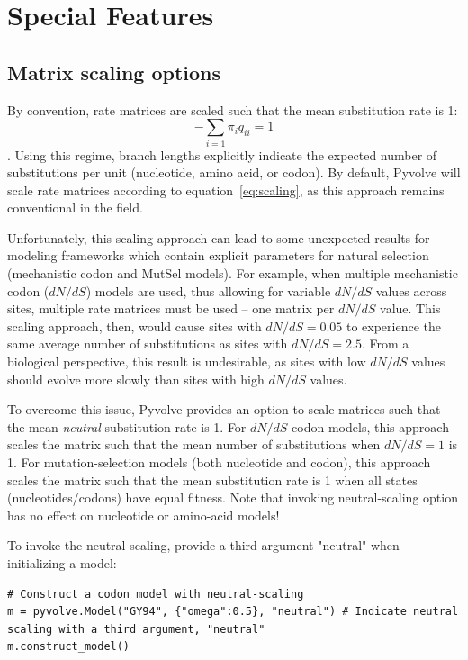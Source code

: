 \documentclass{article}
\begin{document}
\section{Special Features}\label{sec:special}

\subsection{Matrix scaling options}\label{sec:scaling}

By convention, rate matrices are scaled such that the mean substitution rate is 1:
\begin{equation}\label{eq:scaling}
- \sum_{i=1} \pi_iq_{ii} = 1
\end{equation}
 \citep{GY94,Yang1994}. Using this regime, branch lengths explicitly indicate the expected number of substitutions per unit (nucleotide, amino acid, or codon). By default, Pyvolve will scale rate matrices according to equation~\ref{eq:scaling}, as this approach remains conventional in the field. 
 
Unfortunately, this scaling approach can lead to some unexpected results for modeling frameworks which contain explicit parameters for natural selection (mechanistic codon and MutSel models). For example, when multiple mechanistic codon ($dN/dS$) models are used, thus allowing for variable $dN/dS$ values across sites, multiple rate matrices must be used -- one matrix per $dN/dS$ value. This scaling approach, then, would cause sites with $dN/dS = 0.05$ to experience the same average number of substitutions as sites with $dN/dS = 2.5$. From a biological perspective, this result is undesirable, as sites with low $dN/dS$ values should evolve more slowly than sites with high $dN/dS$ values.
 
To overcome this issue, Pyvolve provides an option to scale matrices such that the mean \textit{neutral} substitution rate is 1. For $dN/dS$ codon models, this approach scales the matrix such that the mean number of substitutions when $dN/dS = 1$ is 1. For mutation-selection models (both nucleotide and codon), this approach scales the matrix such that the mean substitution rate is 1 when all states (nucleotides/codons) have equal fitness. Note that invoking neutral-scaling option has no effect on nucleotide or amino-acid models!

To invoke the neutral scaling, provide a third argument "neutral" when initializing a model:
\begin{lstlisting}
# Construct a codon model with neutral-scaling
m = pyvolve.Model("GY94", {"omega":0.5}, "neutral") # Indicate neutral scaling with a third argument, "neutral"
m.construct_model()
\end{lstlisting}
\end{document}
